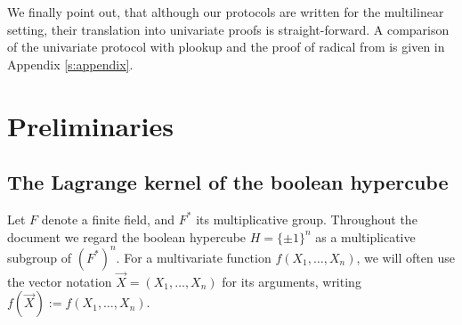 \documentclass[11pt]{article}
\theoremstyle{definition}
\theoremstyle{remark}
\begin{document}
We finally point out, that although our protocols are written for the multilinear setting,  their translation into univariate proofs is straight-forward.
A comparison of the univariate protocol with plookup and the proof of radical from \cite{flookup} is given in Appendix \ref{s:appendix}.






\section{Preliminaries}
\label{s:preliminaries}

\subsection{The Lagrange kernel of the boolean hypercube}

Let $F$ denote a finite field, and $F^*$ its multiplicative group.
Throughout the document we regard the boolean hypercube $H= \{\pm 1\}^n$  as a multiplicative subgroup of  $(F^*)^n$.
For a multivariate function $f(X_1,\ldots, X_n)$, we will often use the vector notation $\vec X = (X_1,\ldots, X_n)$ for its arguments, writing $f(\vec X) := f(X_1,\ldots, X_n)$.
 
\end{document}
